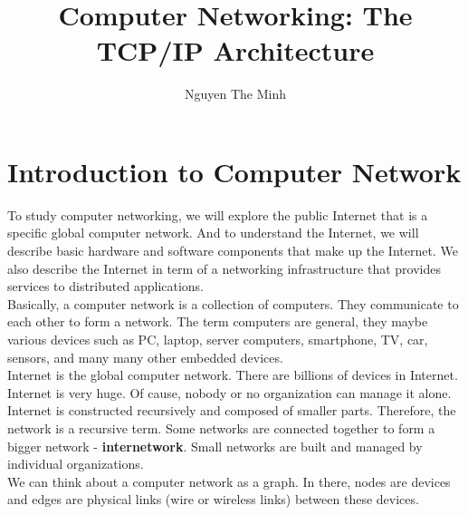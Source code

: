 \documentclass[a4paper, 11pt]{article}
\author{Nguyen The Minh}
\title{Computer Networking: The TCP/IP Architecture}
\begin{document}
\maketitle
\tableofcontents
\newpage
\section{Introduction to Computer Network}

To study computer networking, we will explore the public Internet that is a specific global computer network. And to understand the Internet, we will describe basic hardware and software components that make up the Internet. We also describe the Internet in term of a networking infrastructure that provides services to distributed applications.\\

Basically, a computer network is a collection of computers. They communicate to each other to form a network. The term computers are general, they maybe various devices such as PC, laptop, server computers, smartphone, TV, car, sensors, and many many other embedded devices.\\

Internet is the global computer network. There are billions of devices in Internet.\\

Internet is very huge. Of cause, nobody or no organization can manage it alone. Internet is constructed recursively and composed of smaller parts. Therefore, the network is a recursive term. Some networks are connected together to form a bigger network - \textbf{internetwork}. Small networks are built and managed by individual organizations.\\

We can think about a computer network as a graph. In there, nodes are devices and edges are physical links (wire or wireless links) between these devices.\\
\end{document}
